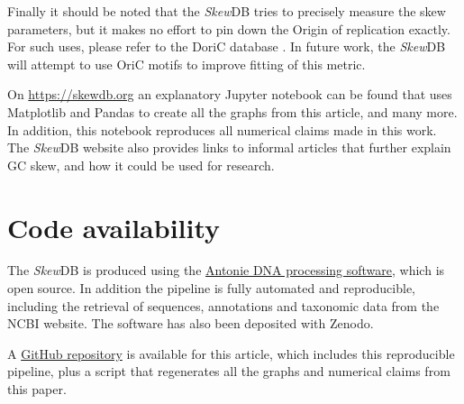 \documentclass[fleqn,10pt]{wlscirep}
\begin{document}
Finally it should be noted that the \emph{Skew}DB tries to precisely measure the skew parameters, but it makes no effort to pin down the Origin of replication exactly. For such uses, please refer to the DoriC database \cite{luo_doric_2019}. In future work, the \emph{Skew}DB will attempt to use OriC motifs to improve fitting of this metric.

On \url{https://skewdb.org} an explanatory Jupyter \cite{Kluyver:2016aa} notebook can be found that uses Matplotlib \cite{Hunter:2007} and Pandas \cite{jeff_reback_2021_5203279} to create all the graphs from this article, and many more. In addition, this notebook reproduces all numerical claims made in this work. The \emph{Skew}DB website also provides links to informal articles that further explain GC skew, and how it could be used for research.

\section*{Code availability}
The \emph{Skew}DB is produced using the \href{https://github.com/berthubert/antonie2}{Antonie DNA processing software}, which is open source. In addition the pipeline is fully automated and reproducible, including the retrieval of sequences, annotations and taxonomic data from the NCBI website. The software has also been deposited with Zenodo\cite{https://doi.org/10.5281/zenodo.5516524}.

A \href{https://github.com/berthubert/skewdb-articles}{GitHub repository} is available for this article, which includes this reproducible pipeline, plus a script that regenerates all the graphs and numerical claims from this paper. 
\end{document}
